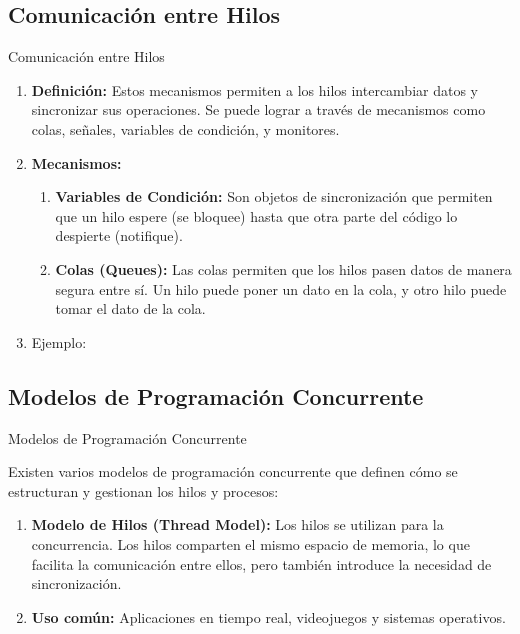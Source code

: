 \documentclass{beamer}
\begin{document}
\subsection{Comunicación entre Hilos}
\begin{frame}{Comunicación entre Hilos}

\begin{block}
    
    \begin{enumerate}
        \item \textbf{Definición:} Estos mecanismos permiten a los hilos intercambiar datos y sincronizar sus operaciones. Se puede lograr a través de mecanismos como colas, señales, variables de condición, y monitores. \pause
        \item \textbf{Mecanismos:}
        \begin{enumerate}
            \item \textbf{Variables de Condición:} Son objetos de sincronización que permiten que un hilo espere (se bloquee) hasta que otra parte del código lo despierte (notifique). 
            \item \textbf{Colas (Queues):} Las colas permiten que los hilos pasen datos de manera segura entre sí. Un hilo puede poner un dato en la cola, y otro hilo puede tomar el dato de la cola.
        \end{enumerate}\pause
        \item Ejemplo: 
    \end{enumerate}
\end{block}
\end{frame}



\subsection{Modelos de Programación Concurrente}
\begin{frame}{Modelos de Programación Concurrente}

\begin{block}

    Existen varios modelos de programación concurrente que definen cómo se estructuran y gestionan los hilos y procesos:

    \begin{enumerate}
        \item \textbf{Modelo de Hilos (Thread Model):} Los hilos se utilizan para la concurrencia. Los hilos comparten el mismo espacio de memoria, lo que facilita la comunicación entre ellos, pero también introduce la necesidad de sincronización. \pause
        \item \textbf{Uso común:} Aplicaciones en tiempo real, videojuegos y sistemas operativos. 
    \end{enumerate}
\end{block}
\end{frame}
\end{document}
